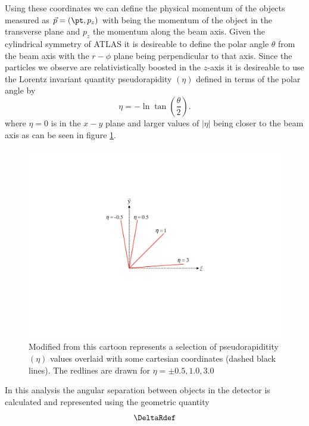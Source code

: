 Using these coordinates we can define the physical momentum of the objects
measured as $\vec{p} = (\pt,p_z)$ with \pt being the momentum of the object in
the transverse plane and $p_z$ the momentum along the beam axis. Given the
cylindrical symmetry of ATLAS it is desireable to define the polar angle
$\theta$ from the beam axis with the $r-\phi$ plane being perpendicular to that
axis. Since the particles we observe are relativistically boosted in the
$z$-axis it is desireable to use the Lorentz invariant quantity pseudorapidity
$(\eta)$ defined in terms of the polar angle by
%
\begin{equation}
 \eta = -\ln \tan \left( \frac{\theta}{2} \right).
\end{equation}
%
where $\eta = 0$ is in the $x-y$ plane and larger values of $|\eta|$ being
closer to the beam axis as can be seen in figure \ref{fig:pseudorapidity}.
%
\begin{figure}[!htbp]
  \begin{center}
    \includegraphics[width=0.5\linewidth]{figures/atlas/pseudorapidity}
    \caption{Modified from \cite{Stark:2317296} this cartoon represents a
selection of pseudorapiditity $(\eta)$ values overlaid with some cartesian
coordinates (dashed black lines).  The redlines are drawn for $\eta = \pm
0.5,1.0,3.0$ }
    \label{fig:pseudorapidity}
  \end{center}
\end{figure}

In this analysis the angular separation between objects in the detector is
calculated and represented using the geometric quantity 
%
\begin{equation}
 \DeltaRdef
\end{equation}
